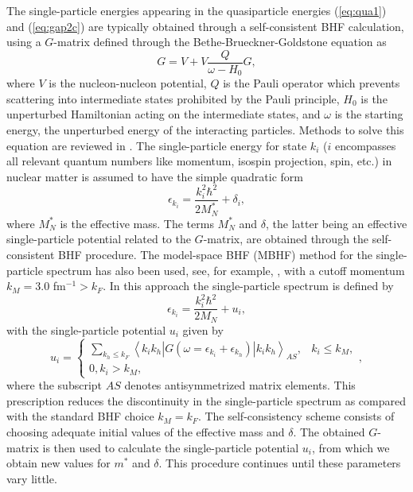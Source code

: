 \documentclass[rmp,aps,floatfix]{revtex4}
\begin{document}
The single-particle energies appearing in the quasiparticle energies  
(\ref{eq:qua1}) and (\ref{eq:gap2c}) are typically 
obtained through a self-consistent 
BHF calculation, 
using a $G$-matrix defined through the Bethe-Brueckner-Goldstone
equation as  
\begin{equation}
   G=V+V\frac{Q}{\omega -H_0}G,
\end{equation}
where $V$ is the nucleon-nucleon potential, $Q$ is the Pauli operator
which prevents scattering into intermediate 
states prohibited by the Pauli
principle, $H_0$ is the unperturbed 
Hamiltonian acting on the intermediate
states, and $\omega$ is the starting energy, 
the unperturbed energy
of the interacting particles. Methods to solve this equation are reviewed in
\cite{mhj_95}.
The single-particle energy for state $k_i$ ($i$ 
encompasses all relevant
quantum numbers like momentum, 
isospin projection, spin, etc.)
in nuclear matter is assumed to have
the simple quadratic form
\begin{equation}
   \epsilon_{k_i}=
   {\displaystyle\frac{k_{i}^2\hbar^2}
   {2M^{*}_N}}+\delta_i ,
   \label{eq:spen}
\end{equation}
where $M_N^{*}$ is the effective mass.
The terms $M_N^{*}$ and $\delta$, the latter being 
an effective single-particle
potential related to the $G$-matrix, are obtained through the
self-consistent BHF  procedure. The 
model-space BHF (MBHF) method 
for the single-particle spectrum has also been used, see,
for example, \cite{mhj_95}, with a cutoff momentum  
$k_M=3.0$ fm$^{-1}>k_{F}$.
In this approach the single-particle spectrum is defined by 
\begin{equation}
\epsilon_{k_{i}}=\frac{k_{i}^{2}\hbar^2}{2M_N}+u_{i}, 
\label{eq:modsp}
\end{equation}
with the single-particle potential $u_{i}$ given by 
\begin{equation}
    u_{i}=
    \left\{\begin{array}{cc}\sum_{k_{h}\leq k_{F}}\left\langle 
 k_{i}k_{h}|G(\omega=\epsilon_{k_{i}}+\epsilon_{k_{h}})|k_{i}k_{h}
\right\rangle_{AS},&k_{i}\leq k_{M},\\
    0,k_{i}>k_{M},\end{array}\right.,
\label{eq:modpot}
\end{equation}
where the subscript $AS$ denotes antisymmetrized matrix elements.  
This prescription reduces the discontinuity in the single-particle spectrum 
as compared with the standard BHF choice $k_{M}=k_{F}$.  
The self-consistency scheme 
consists of choosing adequate initial values of the
effective mass and $\delta$. The obtained $G$-matrix is then used to 
calculate the single-particle potential $u_{i}$, from which we obtain 
new values for $m^{*}$ and $\delta$.  
This procedure continues until these parameters vary little. 
\end{document}
